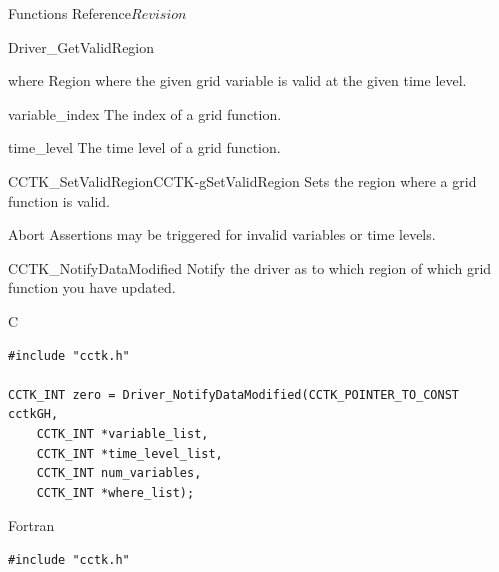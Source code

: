\begin{cactuspart}{ Functions Reference}{}{$Revision$}
\begin{FunctionDescription}{Driver\_GetValidRegion}
\begin{ResultSection}
\begin{Result}{where}
Region where the given grid variable is valid at the given time level.
\end{Result}
\end{ResultSection}

\begin{ParameterSection}
\begin{Parameter}{variable\_index}
The index of a grid function.
\end{Parameter}

\begin{Parameter}{time\_level}
The time level of a grid function.
\end{Parameter}
\end{ParameterSection}

\begin{SeeAlsoSection}
\begin{SeeAlso2}{CCTK\_SetValidRegion}{CCTK-gSetValidRegion}
Sets the region where a grid function is valid.
\end{SeeAlso2}
\end{SeeAlsoSection}

\begin{ErrorSection}
\begin{Error}{Abort}
Assertions may be triggered for invalid variables or time levels.
\end{Error}
\end{ErrorSection}
\end{FunctionDescription}

\begin{FunctionDescription}{CCTK\_NotifyDataModified}
\label{CCTK-gNotifyDataModified}
Notify the driver as to which region of which grid function you have updated.
\begin{SynopsisSection}
\begin{Synopsis}{C}
\begin{verbatim}
#include "cctk.h"

CCTK_INT zero = Driver_NotifyDataModified(CCTK_POINTER_TO_CONST cctkGH,
    CCTK_INT *variable_list,
    CCTK_INT *time_level_list,
    CCTK_INT num_variables,
    CCTK_INT *where_list);

\end{verbatim}
\end{Synopsis}
\begin{Synopsis}{Fortran}
\begin{verbatim}
#include "cctk.h"


\end{verbatim}
\end{Synopsis}
\end{SynopsisSection}
\end{FunctionDescription}
\end{cactuspart}
